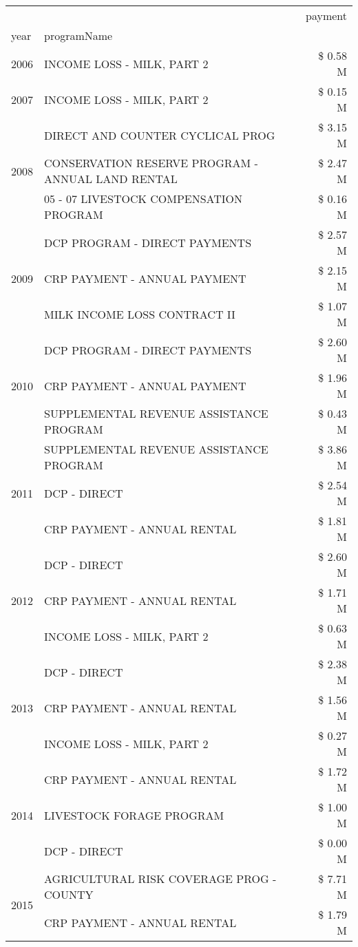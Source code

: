 \begin{tabular}{llr}
\toprule
 &  & payment \\
year & programName &  \\
\midrule
2006 & INCOME LOSS - MILK, PART 2 & \$ 0.58 M \\
\cline{1-3}
2007 & INCOME LOSS - MILK, PART 2 & \$ 0.15 M \\
\cline{1-3}
\multirow[t]{3}{*}{2008} & DIRECT AND COUNTER CYCLICAL PROG & \$ 3.15 M \\
 & CONSERVATION RESERVE PROGRAM - ANNUAL LAND RENTAL & \$ 2.47 M \\
 & 05 - 07 LIVESTOCK COMPENSATION PROGRAM & \$ 0.16 M \\
\cline{1-3}
\multirow[t]{3}{*}{2009} & DCP PROGRAM - DIRECT PAYMENTS & \$ 2.57 M \\
 & CRP PAYMENT - ANNUAL PAYMENT & \$ 2.15 M \\
 & MILK INCOME LOSS CONTRACT II & \$ 1.07 M \\
\cline{1-3}
\multirow[t]{3}{*}{2010} & DCP PROGRAM - DIRECT PAYMENTS & \$ 2.60 M \\
 & CRP PAYMENT - ANNUAL PAYMENT & \$ 1.96 M \\
 & SUPPLEMENTAL REVENUE ASSISTANCE PROGRAM & \$ 0.43 M \\
\cline{1-3}
\multirow[t]{3}{*}{2011} & SUPPLEMENTAL REVENUE ASSISTANCE PROGRAM & \$ 3.86 M \\
 & DCP - DIRECT & \$ 2.54 M \\
 & CRP PAYMENT - ANNUAL RENTAL & \$ 1.81 M \\
\cline{1-3}
\multirow[t]{3}{*}{2012} & DCP - DIRECT & \$ 2.60 M \\
 & CRP PAYMENT - ANNUAL RENTAL & \$ 1.71 M \\
 & INCOME LOSS - MILK, PART 2 & \$ 0.63 M \\
\cline{1-3}
\multirow[t]{3}{*}{2013} & DCP - DIRECT & \$ 2.38 M \\
 & CRP PAYMENT - ANNUAL RENTAL & \$ 1.56 M \\
 & INCOME LOSS - MILK, PART 2 & \$ 0.27 M \\
\cline{1-3}
\multirow[t]{3}{*}{2014} & CRP PAYMENT - ANNUAL RENTAL & \$ 1.72 M \\
 & LIVESTOCK FORAGE PROGRAM & \$ 1.00 M \\
 & DCP - DIRECT & \$ 0.00 M \\
\cline{1-3}
\multirow[t]{3}{*}{2015} & AGRICULTURAL RISK COVERAGE PROG - COUNTY & \$ 7.71 M \\
 & CRP PAYMENT - ANNUAL RENTAL & \$ 1.79 M \\

\end{tabular}
